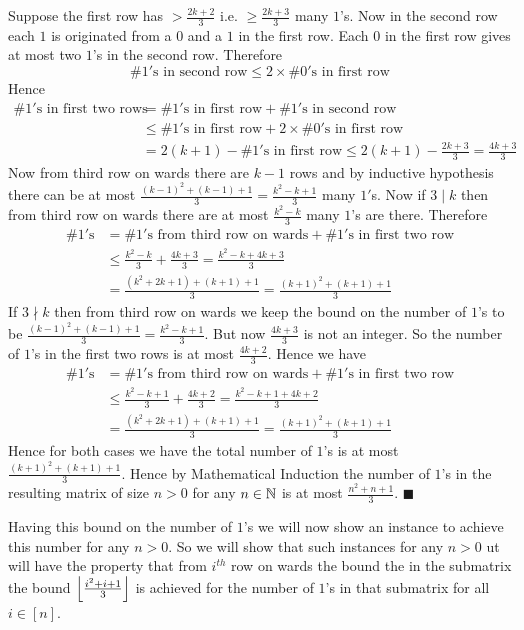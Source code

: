\documentclass[a4paper, 11pt]{article}
\renewenvironment{proof}{\noindent{\it \textbf{Proof:}}\hspace*{1em}}{\hfill $\blacksquare$\bigskip\\}
\begin{document}
{\begin{proof}
	 Suppose the first row has $>\frac{2k+2}{3}$ i.e. $\geq \frac{2k+3}3$ many $1$'s. Now in the second row each $1$ is originated from a $0$ and a $1$ in the first row. Each $0$ in the first row gives at most two $1$'s in the second row. Therefore $$\#1'\text{s in second row}\leq 2\times \#0'\text{s in first row}$$Hence \begin{align*}
	 	\#1'\text{s in first two rows}&=\#1'\text{s in first row}+\#1'\text{s in second row}\\
	 	& \leq \#1'\text{s in first row}+2\times \#0'\text{s in first row}\\
	 	& = 2(k+1)-\#1'\text{s in first row}\leq 2(k+1)-\frac{2k+3}3  =\frac{4k+3}3
	 \end{align*}Now from third row on wards there are $k-1$ rows and by inductive hypothesis there can be at most $\frac{(k-1)^2+(k-1)+1}3=\frac{k^2-k+1}3$ many $1'$s. Now if $3\mid k$ then from third row on wards there are at most $\frac{k^2-k}3$ many $1$'s are there. Therefore \begin{align*}
	 \#1'\text{s}&=\#1'\text{s from third row on wards}+\#1'\text{s in first two  row}\\
	 & \leq \frac{k^2-k}3+\frac{4k+3}3=\frac{k^2-k+4k+3}3\\
	 &=\frac{(k^2+2k+1)+(k+1)+1}3=\frac{(k+1)^2+(k+1)+1}3
 \end{align*}
If $3\nmid k$ then from third row on wards we keep the bound on the number of $1$'s to be $\frac{(k-1)^2+(k-1)+1}3=\frac{k^2-k+1}{3}$. But now $\frac{4k+3}3$ is not an integer. So the number of $1$'s in the first two rows is at most $\frac{4k+2}3$. Hence we have  \begin{align*}
	\#1'\text{s}&=\#1'\text{s from third row on wards}+\#1'\text{s in first two  row}\\
	& \leq \frac{k^2-k+1}3+\frac{4k+2}3=\frac{k^2-k+1+4k+2}3\\
	&=\frac{(k^2+2k+1)+(k+1)+1}3=\frac{(k+1)^2+(k+1)+1}3
\end{align*}Hence for both cases we have the total number of $1$'s is at most $\frac{(k+1)^2+(k+1)+1}{3}$. Hence by Mathematical Induction the number of $1$'s in the resulting matrix of size $n>0$ for any $n\in\mathbb{N}$ is at most $\frac{n^2+n+1}{3}$.
\end{proof}

Having this bound on the number of $1$'s we will now show an instance to achieve this number for any $n>0$. So we will show that such instances  for any $n>0$ ut will have the property that from $i^{th}$ row on wards the bound the in the submatrix the bound $\left\lfloor \frac{i^2+i+1}{3}\right\rfloor$ is achieved for the number of $1$'s in that submatrix for all $i\in[n]$. 

}
\end{document}
